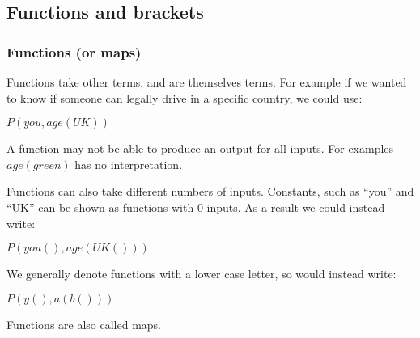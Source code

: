 
\subsection{Functions and brackets}

\subsubsection{Functions (or maps)}

Functions take other terms, and are themselves terms. For example if we wanted to know if someone can legally drive in a specific country, we could use:

\(P(you,age(UK))\)

A function may not be able to produce an output for all inputs. For examples \(age(green)\) has no interpretation.

Functions can also take different numbers of inputs. Constants, such as “you” and “UK” can be shown as functions with \(0\) inputs. As a result we could instead write:

\(P(you(),age(UK()))\)

We generally denote functions with a lower case letter, so would instead write:

\(P(y(),a(b()))\)

Functions are also called maps.

